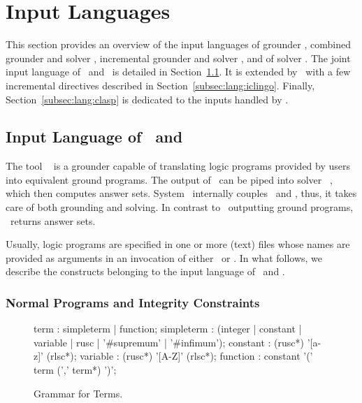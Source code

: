 \section{Input Languages}\label{sec:language}

This section provides an overview of the input languages of
grounder \gringo, combined grounder and solver \clingo,
incremental grounder and solver \iclingo, and of solver \clasp.
The joint input language of \gringo\ and \clingo\ is detailed in
Section~\ref{subsec:lang:gringo}.
It is extended by \iclingo\ with a few incremental directives described in Section~\ref{subsec:lang:iclingo}.
Finally, Section~\ref{subsec:lang:clasp} is dedicated to the inputs
handled by \clasp.


\subsection{Input Language of \gringo\ and \clingo}\label{subsec:lang:gringo}

The tool \gringo~\cite{gescth07a} is a grounder capable of translating
logic programs provided by users into equivalent ground programs.
The output of \gringo\ can be piped into solver \clasp~\cite{gekanesc07a},
which then computes answer sets.
System \clingo\ internally couples \gringo\ and \clasp, thus,
it takes care of both grounding and solving.
In contrast to \gringo\ outputting ground programs, 
\clingo\ returns answer sets.

Usually, logic programs are specified in one or more (text) files whose names are
provided as arguments
in an invocation of either \gringo\ or \clingo.
In what follows, we describe the 
constructs belonging to the input language of \gringo\ and \clingo.


\subsubsection{Normal Programs and Integrity Constraints}\label{subsec:gringo:normal}

\begin{figure}
\vspace*{-19mm}
\railnontermfont{\rmfamily\itshape}%
\begin{rail}
	term        : simpleterm | function;
	simpleterm  : (integer | constant | variable | rusc | '\#supremum' | '\#infimum');
	constant    : (rusc*) '[a-z]' (rlsc*);
	variable    : (rusc*) '[A-Z]' (rlsc*);
	function    : constant '(' term (',' term*) ')';
\end{rail}
\caption{Grammar for Terms.\label{fig:terms}}
\end{figure}

